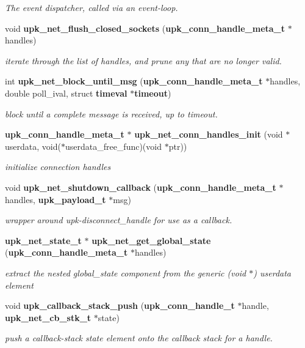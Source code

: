 \begin{DoxyCompactItemize}
\begin{DoxyCompactList}\small\item\em The event dispatcher, called via an event-\/loop. \end{DoxyCompactList}\item 
void {\bf upk\_\-net\_\-flush\_\-closed\_\-sockets} ({\bf upk\_\-conn\_\-handle\_\-meta\_\-t} $\ast$handles)
\begin{DoxyCompactList}\small\item\em iterate through the list of handles, and prune any that are no longer valid. \end{DoxyCompactList}\item 
int {\bf upk\_\-net\_\-block\_\-until\_\-msg} ({\bf upk\_\-conn\_\-handle\_\-meta\_\-t} $\ast$handles, double poll\_\-ival, struct {\bf timeval} $\ast${\bf timeout})
\begin{DoxyCompactList}\small\item\em block until a complete message is received, up to timeout. \end{DoxyCompactList}\item 
{\bf upk\_\-conn\_\-handle\_\-meta\_\-t} $\ast$ {\bf upk\_\-net\_\-conn\_\-handles\_\-init} (void $\ast$userdata, void($\ast$userdata\_\-free\_\-func)(void $\ast$ptr))
\begin{DoxyCompactList}\small\item\em initialize connection handles \end{DoxyCompactList}\item 
void {\bf upk\_\-net\_\-shutdown\_\-callback} ({\bf upk\_\-conn\_\-handle\_\-meta\_\-t} $\ast$handles, {\bf upk\_\-payload\_\-t} $\ast$msg)
\begin{DoxyCompactList}\small\item\em wrapper around upk-\/disconnect\_\-handle for use as a callback. \end{DoxyCompactList}\item 
{\bf upk\_\-net\_\-state\_\-t} $\ast$ {\bf upk\_\-net\_\-get\_\-global\_\-state} ({\bf upk\_\-conn\_\-handle\_\-meta\_\-t} $\ast$handles)
\begin{DoxyCompactList}\small\item\em extract the nested global\_\-state component from the generic (void $\ast$) userdata element \end{DoxyCompactList}\item 
void {\bf upk\_\-callback\_\-stack\_\-push} ({\bf upk\_\-conn\_\-handle\_\-t} $\ast$handle, {\bf upk\_\-net\_\-cb\_\-stk\_\-t} $\ast$state)
\begin{DoxyCompactList}\small\item\em push a callback-\/stack state element onto the callback stack for a handle. \end{DoxyCompactList}\item 

\end{DoxyCompactItemize}
